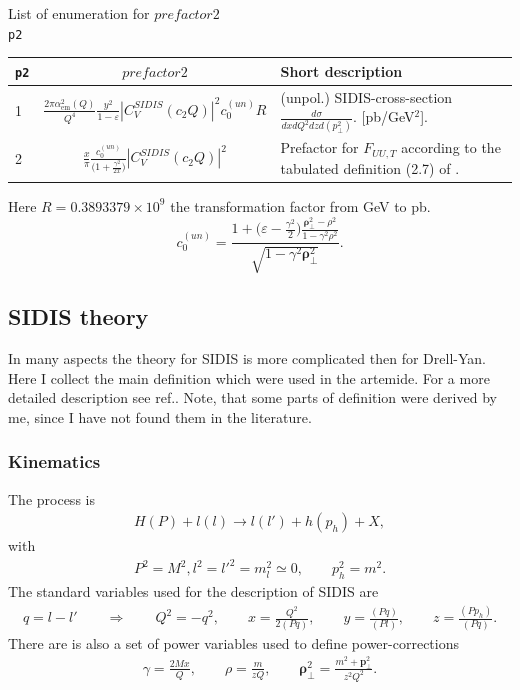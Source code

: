 \documentclass[prd,nofootinbib,eqsecnum,final]{revtex4}
\renewcommand{\(}{\left(}
\renewcommand{\)}{\right)}
\renewcommand{\[}{\left[}
\renewcommand{\]}{\right]}
\renewcommand{\vec}[1]{\bm{#1}}
\begin{document}
\begin{center}
List of enumeration for $prefactor2$
\\
\texttt{p2}
\\
\begin{tabular}{||l|c||p{12cm}||}
\hline\hline
\texttt{p2} & ~~$prefactor2$~~&  Short description 
\\\hline
1 & $\frac{2\pi \alpha_{\text{em}}^2(Q)}{Q^4}\frac{y^2}{1-\varepsilon}|C_V^{SIDIS}(c_2Q)|^2 c^{(un)}_0 R$ & (unpol.) SIDIS-cross-section $\frac{d\sigma}{dx dQ^2 dz d(p_\perp^2)}$. [pb/GeV$^2$].
\\\hline
2 & $\frac{x}{\pi}\frac{c_0^{(un)}}{\Big(1+\frac{\gamma^2}{2x}\Big)}|C_V^{SIDIS}(c_2Q)|^2$ & Prefactor for $F_{UU,T}$ according to the tabulated definition (2.7) of \cite{Bacchetta:2006tn}. 
\\\hline\hline
\end{tabular}
Here $R=0.3893379\times 10^9$ the transformation factor from GeV to pb.
$$
c_0^{(un)}=\frac{1+\Big(\varepsilon-\frac{\gamma^2}{2}\Big)\frac{\vec \rho_\perp^2-\rho^2}{1-\gamma^2\rho^2}}{\sqrt{1-\gamma^2 \vec \rho_\perp^2}}.
$$
\end{center}

\subsection{SIDIS theory}
\label{sec:SIDIS:theory}

In many aspects the theory for SIDIS is more complicated then for Drell-Yan. Here I collect the main definition which were used in the artemide. For a more detailed description see ref.\cite{Bacchetta:2006tn}. Note, that some parts of definition were derived by me, since I have not found them in the literature.

\subsubsection{Kinematics}

The process is
\begin{eqnarray}
H(P)+l(l)\to l(l')+h(p_h)+X,
\end{eqnarray}
with
\begin{eqnarray}
P^2=M^2, l^2=l'^2=m_l^2\simeq 0,\qquad p_h^2=m^2.
\end{eqnarray}
The standard variables used for the description of SIDIS are
\begin{eqnarray}
q=l-l' \qquad \Rightarrow \qquad Q^2=-q^2,\qquad x=\frac{Q^2}{2(Pq)},\qquad y=\frac{(Pq)}{(Pl)},\qquad z=\frac{(Pp_h)}{(Pq)}.
\end{eqnarray}
There are is also a set of power variables used to define power-corrections
\begin{eqnarray}
\gamma=\frac{2Mx}{Q},\qquad \rho=\frac{m}{zQ},\qquad \vec \rho_\perp^2=\frac{m^2+\vec p_\perp^2}{z^2Q^2}.
\end{eqnarray}
\end{document}
